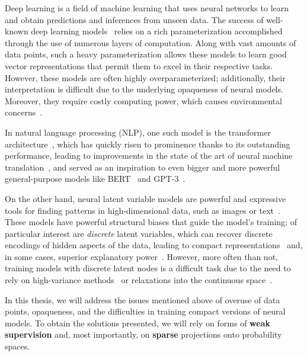 \label{cap:int}

\cleardoublepage
\doublespacing

\noindent Deep learning is a field of machine learning that uses
neural networks to learn and obtain predictions
and inferences from unseen data. The success of well-known deep
learning models~\citep[\textit{inter
        alia}]{convnet,devlin2018bert,brown2020language} relies on a rich
parameterization accomplished through the use of numerous layers of
computation. Along with vast amounts of data points,
such a heavy parameterization allows these models to learn good
vector representations that permit them to excel in their respective
tasks. However, these models are often highly overparameterized;
additionally, their interpretation is difficult due to the underlying
opaqueness of neural models. Moreover, they require costly computing
power, which causes environmental concerns~\citep{Strubell2019}.

In
natural language processing (NLP), one such model is the transformer
architecture~\citep{vaswani2017attention}, which has quickly risen to
prominence thanks to its outstanding performance, leading to
improvements in the state of the art of neural machine
translation~\citep[NMT;][]{marian,ott2018scaling}, and served as an
inspiration to even bigger and more powerful general-purpose models
like BERT~\citep{devlin2018bert} and
\mbox{GPT-3}~\citep{brown2020language}.

On the other hand, neural latent variable models are powerful and
expressive tools for finding patterns in high-dimensional data, such
as images or text~\citep{Kim2018,Kingma+2014:VAE,RezendeEtAl14VAE}.
These models have powerful structural biases that guide the model's
training; of particular interest are \emph{discrete} latent
variables, which can recover discrete encodings of hidden aspects of
the data, leading to compact
representations~\citep{KingmaEtAl2014SSVAE} and, in some cases,
superior explanatory power~\citep{titov2008joint, Bastings2019}.
However, more often than not, training models with discrete latent
nodes is a difficult task due to the need to rely on high-variance
methods~\citep[\eg, \textsc{REINFORCE};][]{Williams1992} or relaxations
into the continuous space~\citep[\eg,
    Gumbel-Softmax;][]{GumbelSoftmax,Concrete}.

In this thesis, we will address the issues mentioned above of overuse
of data points, opaqueness, and the difficulties in training compact
versions of neural models. To obtain the solutions presented, we will
rely on forms of \textbf{weak supervision} and, most importantly, on
\textbf{sparse} projections onto probability spaces.

